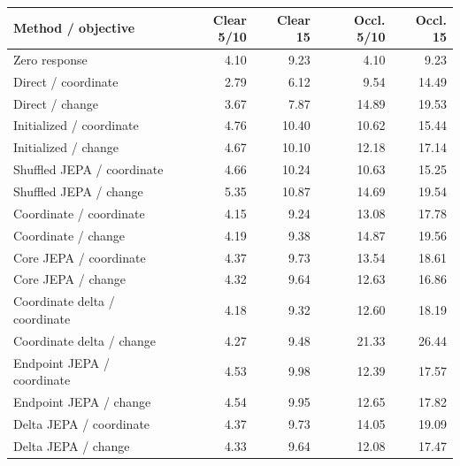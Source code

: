 \begin{tabular}{lrrrr}\toprule
Method / objective & Clear 5/10 & Clear 15 & Occl. 5/10 & Occl. 15\\\midrule
Zero response & 4.10 & 9.23 & 4.10 & 9.23 \\
Direct / coordinate & 2.79 & 6.12 & 9.54 & 14.49 \\
Direct / change & 3.67 & 7.87 & 14.89 & 19.53 \\
Initialized / coordinate & 4.76 & 10.40 & 10.62 & 15.44 \\
Initialized / change & 4.67 & 10.10 & 12.18 & 17.14 \\
Shuffled JEPA / coordinate & 4.66 & 10.24 & 10.63 & 15.25 \\
Shuffled JEPA / change & 5.35 & 10.87 & 14.69 & 19.54 \\
Coordinate / coordinate & 4.15 & 9.24 & 13.08 & 17.78 \\
Coordinate / change & 4.19 & 9.38 & 14.87 & 19.56 \\
Core JEPA / coordinate & 4.37 & 9.73 & 13.54 & 18.61 \\
Core JEPA / change & 4.32 & 9.64 & 12.63 & 16.86 \\
Coordinate delta / coordinate & 4.18 & 9.32 & 12.60 & 18.19 \\
Coordinate delta / change & 4.27 & 9.48 & 21.33 & 26.44 \\
Endpoint JEPA / coordinate & 4.53 & 9.98 & 12.39 & 17.57 \\
Endpoint JEPA / change & 4.54 & 9.95 & 12.65 & 17.82 \\
Delta JEPA / coordinate & 4.37 & 9.73 & 14.05 & 19.09 \\
Delta JEPA / change & 4.33 & 9.64 & 12.08 & 17.47 \\
\bottomrule\end{tabular}
